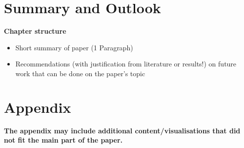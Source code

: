 \documentclass[conference]{IEEEtran}
\begin{document}
\color{blindtext}\blindtext\blindtext\vspace{\baselineskip}\blindtext\color{black}

\section{Summary and Outlook}

\color{structure}
\textbf{Chapter structure}
\begin{itemize}
    \item Short summary of paper (1 Paragraph)
    \item Recommendations (with justification from literature or results!) on future work that can be done on the paper's topic
\end{itemize}
\color{black}

\color{blindtext}\blindtext\blindtext\color{black}

{\small


}


\clearpage 

\section*{Appendix}
\color{twblue}\textbf{The appendix may include additional content/visualisations that did not fit the main part of the paper.}\color{black}
\end{document}
